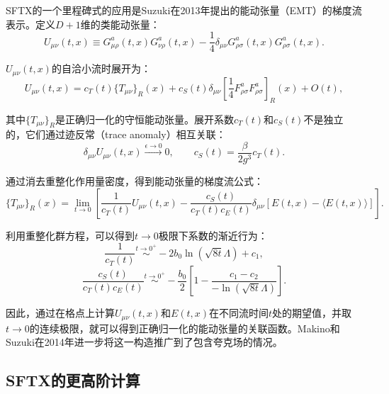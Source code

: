 \documentclass[12pt,a4paper]{ctexart}
\theoremstyle{definition}
\begin{document}
SFTX的一个里程碑式的应用是Suzuki在2013年提出的能动张量（EMT）的梯度流表示\cite{Suzuki2013}。定义$D+1$维的类能动张量：
\begin{equation}
U_{\mu\nu}(t,x) \equiv G_{\mu\rho}^a(t,x) G_{\nu\rho}^a(t,x) - \frac{1}{4} \delta_{\mu\nu} G_{\rho\sigma}^a(t,x) G_{\rho\sigma}^a(t,x).
\label{eq:U_munu}
\end{equation}

$U_{\mu\nu}(t,x)$的自洽小流时展开为\cite{Suzuki2013}：
\begin{equation}
U_{\mu\nu}(t,x) = c_T(t) \{T_{\mu\nu}\}_R(x) + c_S(t) \delta_{\mu\nu} \left[ \frac{1}{4} F_{\rho\sigma}^a F_{\rho\sigma}^a \right]_R(x) + O(t),
\label{eq:U_sftx}
\end{equation}

其中$\{T_{\mu\nu}\}_R$是正确归一化的守恒能动张量。展开系数$c_T(t)$和$c_S(t)$不是独立的，它们通过迹反常（trace anomaly）相互关联：
\begin{equation}
\delta_{\mu\nu} U_{\mu\nu}(t,x) \overset{\epsilon \to 0}{\longrightarrow} 0, \qquad
c_S(t) = \frac{\beta}{2g^3} c_T(t).
\label{eq:trace_anomaly_relation}
\end{equation}

通过消去重整化作用量密度，得到能动张量的梯度流公式\cite{Suzuki2013}：
\begin{equation}
\{T_{\mu\nu}\}_R(x) = \lim_{t \to 0} \left[ \frac{1}{c_T(t)} U_{\mu\nu}(t,x) - \frac{c_S(t)}{c_T(t)c_E(t)} \delta_{\mu\nu} [E(t,x) - \langle E(t,x) \rangle] \right].
\label{eq:emt_flow_formula}
\end{equation}

利用重整化群方程，可以得到$t \to 0$极限下系数的渐近行为\cite{Suzuki2013}：
\begin{equation}
\frac{1}{c_T(t)} \overset{t \to 0^+}{\sim} -2b_0 \ln(\sqrt{8t}\Lambda) + c_1,
\label{eq:cT_asymptotic}
\end{equation}
\begin{equation}
\frac{c_S(t)}{c_T(t)c_E(t)} \overset{t \to 0^+}{\sim} -\frac{b_0}{2} \left[ 1 - \frac{c_1 - c_2}{-\ln(\sqrt{8t}\Lambda)} \right].
\label{eq:cS_ct_cE_asymptotic}
\end{equation}

因此，通过在格点上计算$U_{\mu\nu}(t,x)$和$E(t,x)$在不同流时间$t$处的期望值，并取$t \to 0$的连续极限，就可以得到正确归一化的能动张量的关联函数。Makino和Suzuki在2014年进一步将这一构造推广到了包含夸克场的情况\cite{MakinoSuzuki2014}。

\subsection{SFTX的更高阶计算}
\end{document}
